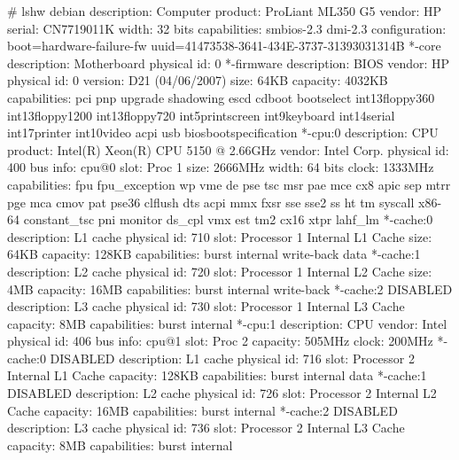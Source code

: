 \documentclass[mingoth,a4paper]{jsarticle}
\begin{document}
\begin{commandline}
# lshw 
debian
    description: Computer
    product: ProLiant ML350 G5
    vendor: HP
    serial: CN7719011K
    width: 32 bits
    capabilities: smbios-2.3 dmi-2.3
    configuration: boot=hardware-failure-fw uuid=41473538-3641-434E-3737-31393031314B
  *-core
       description: Motherboard
       physical id: 0
     *-firmware
          description: BIOS
          vendor: HP
          physical id: 0
          version: D21 (04/06/2007)
          size: 64KB
          capacity: 4032KB
          capabilities: pci pnp upgrade shadowing escd cdboot bootselect int13floppy360 int13floppy1200 int13floppy720 int5printscreen int9keyboard int14serial int17printer int10video acpi usb biosbootspecification
     *-cpu:0
          description: CPU
          product: Intel(R) Xeon(R) CPU            5150  @ 2.66GHz
          vendor: Intel Corp.
          physical id: 400
          bus info: cpu@0
          slot: Proc 1
          size: 2666MHz
          width: 64 bits
          clock: 1333MHz
          capabilities: fpu fpu_exception wp vme de pse tsc msr pae mce cx8 apic sep mtrr pge mca cmov pat pse36 clflush dts acpi mmx fxsr sse sse2 ss ht tm syscall x86-64 constant_tsc pni monitor ds_cpl vmx est tm2 cx16 xtpr lahf_lm
        *-cache:0
             description: L1 cache
             physical id: 710
             slot: Processor 1 Internal L1 Cache
             size: 64KB
             capacity: 128KB
             capabilities: burst internal write-back data
        *-cache:1
             description: L2 cache
             physical id: 720
             slot: Processor 1 Internal L2 Cache
             size: 4MB
             capacity: 16MB
             capabilities: burst internal write-back
        *-cache:2 DISABLED
             description: L3 cache
             physical id: 730
             slot: Processor 1 Internal L3 Cache
             capacity: 8MB
             capabilities: burst internal
     *-cpu:1
          description: CPU
          vendor: Intel
          physical id: 406
          bus info: cpu@1
          slot: Proc 2
          capacity: 505MHz
          clock: 200MHz
        *-cache:0 DISABLED
             description: L1 cache
             physical id: 716
             slot: Processor 2 Internal L1 Cache
             capacity: 128KB
             capabilities: burst internal data
        *-cache:1 DISABLED
             description: L2 cache
             physical id: 726
             slot: Processor 2 Internal L2 Cache
             capacity: 16MB
             capabilities: burst internal
        *-cache:2 DISABLED
             description: L3 cache
             physical id: 736
             slot: Processor 2 Internal L3 Cache
             capacity: 8MB
             capabilities: burst internal
\end{commandline}
\end{document}
